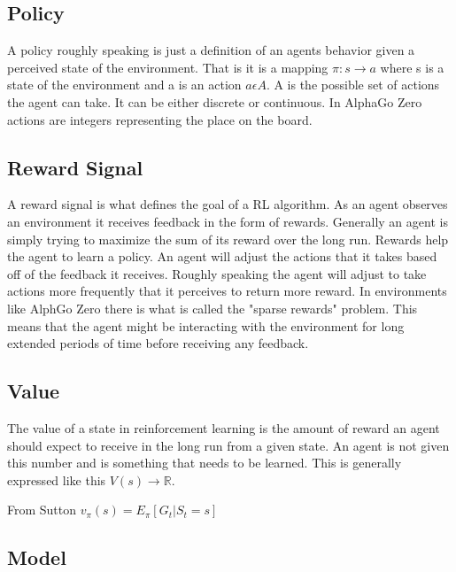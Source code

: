     \subsection{Policy}
    
    A policy roughly speaking is just a definition of an agents behavior given a perceived state of the environment. That is it is a mapping $ \pi: s \rightarrow a $ where s is a state of the environment and a is an action  $ a \epsilon A $. A is the possible set of actions the agent can take. It can be either discrete or continuous. In AlphaGo Zero actions are integers representing the place on the board.
    
    \subsection{Reward Signal}
    
    A reward signal is what defines the goal of a RL algorithm. As an agent observes an environment it receives feedback in the form of rewards. Generally an agent is simply trying to maximize the sum of its reward over the long run. Rewards help the agent to learn a policy. An agent will adjust the actions that it takes based off of the feedback it receives. Roughly speaking the agent will adjust to take actions more frequently that it perceives to return more reward. In environments like AlphGo Zero there is what is called the "sparse rewards" problem. This means that the agent might be interacting with the environment for long extended periods of time before receiving any feedback. 
    
    
    \subsection{Value}
    
    The value of a state in reinforcement learning is the amount of reward an agent should expect to receive in the long run from a given state. An agent is not given this number and is something that needs to be learned. This is generally expressed like this $ V(s) \rightarrow \mathbb{R} $. 
    
    From Sutton
    $ v_{\pi}(s) = E_{\pi}[G_{t}| S_{t} = s]$
    
    
    \subsection{Model}
    
